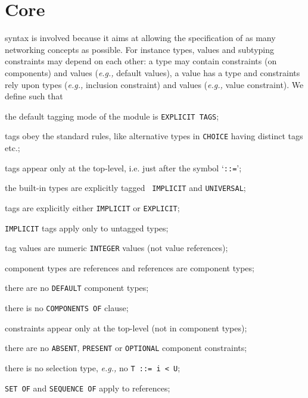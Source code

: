 
\section{Core \ASN}

\ASN syntax is involved because it aims at allowing the specification
of as many networking concepts as possible. For instance types, values
and subtyping constraints may depend on each other: a type may contain
constraints (on components) and values (\emph{e.g.,} default values),
a value has a type and constraints rely upon types (\emph{e.g.,}
inclusion constraint) and values (\emph{e.g.,} value constraint). We
define \core such that

\medskip

\begin{itemize}

  \bitem the default tagging mode of the module is \texttt{\small EXPLICIT
  TAGS};

  \bitem tags obey the standard rules, like alternative types in
  \texttt{\small CHOICE} having distinct tags etc.;

  \bitem tags appear only at the top-level, i.e. just after the symbol
  `{\small \verb+::=+}';

  \bitem the built-in types are explicitly tagged \texttt{\small
  IMPLICIT} and \texttt{\small UNIVERSAL};

  \bitem tags are explicitly either \texttt{\small IMPLICIT} or
  \texttt{EXPLICIT};

  \bitem \texttt{\small IMPLICIT} tags apply only to untagged
  types;

  \bitem tag values are numeric \texttt{\small INTEGER} values (not
  value references);

  \bitem component types are references and references are component
  types;

  \bitem there are no \texttt{DEFAULT} component types;

  \bitem there is no \texttt{\small COMPONENTS OF} clause;

  \bitem constraints appear only at the top-level (not in component
  types);

  \bitem there are no \texttt{\small ABSENT}, \texttt{\small PRESENT}
  or \texttt{\small OPTIONAL} component constraints;

  \bitem there is no selection type, \emph{e.g.,} no {\small \verb+T ::= i < U+};

  \bitem \texttt{\small SET OF} and \texttt{\small SEQUENCE OF} apply
  to references;


\end{itemize}
